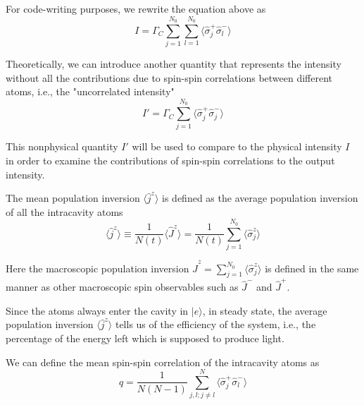 \documentclass{article}
\newcommand{\gc}{\Gamma_C}
\newcommand{\estate}{|e\rangle}
\begin{document}
For code-writing purposes, we rewrite the equation above as
\begin{equation}
\label{icumulant}
    I = \gc\sum_{j=1}^{N_0}\sum_{l=1}^{N_0}\langle \hat{\sigma}_j^+\hat{\sigma}_l^-\rangle
\end{equation}

Theoretically, we can introduce another quantity that represents the intensity without all the contributions due to spin-spin correlations between different atoms, i.e., the "uncorrelated intensity"
\begin{equation}
\label{iuncorcumulant}
    I'=\gc\sum_{j=1}^{N_0}\langle \hat{\sigma}_j^+\hat{\sigma}_j^-\rangle
\end{equation}

This nonphysical quantity $I'$ will be used to compare to the physical intensity $I$ in order to examine the contributions of spin-spin correlations to the output intensity.

The mean population inversion $\langle \hat{j}^z\rangle$ is defined as the average population inversion of all the intracavity atoms
\begin{equation}
\label{jzcumulant}
      \langle\hat{j}^z\rangle\equiv\frac{1}{N(t)}\langle\hat{J}^z\rangle=\frac{1}{N(t)}\sum_{j=1}^{N_0}\langle\hat{\sigma}_j^z\rangle
\end{equation}

Here the macroscopic population inversion $\hat{J}^z=\sum_{j=1}^{N_0}\langle\hat{\sigma}_j^z\rangle$ is defined in the same manner as other macroscopic spin observables such as $\hat{J}^-$ and $\hat{J}^+$.

Since the atoms always enter the cavity in $\estate$, in steady state, the average population inversion $\langle \hat{j}^z\rangle$ tells us of the efficiency of the system, i.e., the percentage of the energy left which is supposed to produce light.

We can define the mean spin-spin correlation of the intracavity atoms as
\begin{equation}
\label{qcumulant}
    q=\frac{1}{N(N-1)}\sum_{j,l; j\neq l}^{N}\langle \hat{\sigma}_j^+\hat{\sigma}_l^-\rangle
\end{equation}
\end{document}
